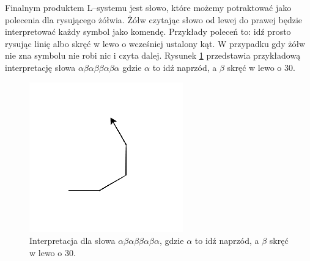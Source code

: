\documentclass[inz,shortabstract]{iithesis}
\begin{document}
        Finalnym produktem L--systemu jest słowo, które możemy potraktować jako polecenia dla rysującego żółwia. Żółw czytając słowo od lewej do prawej będzie interpretować każdy symbol jako komendę. Przykłady poleceń to: idź prosto rysując linię albo skręć w lewo o wcześniej ustalony kąt. W przypadku gdy żółw nie zna symbolu nie robi nic i czyta dalej. Rysunek \ref{fig:turtleExample} przedstawia przykładową interpretację słowa $\alpha\beta\alpha\beta\beta\alpha\beta\alpha$ gdzie $\alpha$ to idź naprzód, a $\beta$ skręć w lewo o 30\degree.
        \begin{figure}[h]
            \centering
            \includegraphics[width=0.4\linewidth]{turtleExample.png}
            \caption{Interpretacja dla słowa $\alpha\beta\alpha\beta\beta\alpha\beta\alpha$, gdzie $\alpha$ to idź naprzód, a $\beta$ skręć w lewo o 30\degree.}
            \label{fig:turtleExample}
        \end{figure}
        
\end{document}
